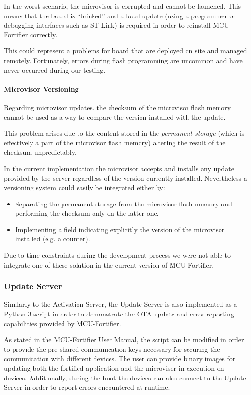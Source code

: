 \documentclass{article}
\begin{document}
In the worst scenario, the microvisor is corrupted and cannot be launched. This means that the board is ``bricked'' and a local update (using a programmer or debugging interfaces such as ST-Link) is required in order to reinstall MCU-Fortifier correctly.

This could represent a problems for board that are deployed on site and managed remotely. Fortunately, errors during flash programming are uncommon and have never occurred during our testing.

\paragraph{Microvisor Versioning}
Regarding microvisor updates, the checksum of the microvisor flash memory cannot be used as a way to compare the version installed with the update.

This problem arises due to the content stored in the \textit{permanent storage} (which is effectively a part of the microvisor flash memory) altering the result of the checksum unpredictably.

In the current implementation the microvisor accepts and installs any update provided by the server regardless of the version currently installed.
Nevertheless a versioning system could easily be integrated either by:
\begin{itemize}
	\item Separating the permanent storage from the microvisor flash memory and performing the checksum only on the latter one.
	\item Implementing a field indicating explicitly the version of the microvisor installed (e.g. a counter).
\end{itemize}
Due to time constraints during the development process we were not able to integrate one of these solution in the current version of MCU-Fortifier.

\subsubsection{Update Server}
\label{subsubsec:update_server}
Similarly to the Activation Server, the Update Server is also implemented as a Python 3 script in order to demonstrate the OTA update and error reporting capabilities provided by MCU-Fortifier.

As stated in the MCU-Fortifier User Manual\cite{user_manual}, the script can be modified in order to provide the pre-shared communication keys necessary for securing the communication with different devices. The user can provide binary images for updating both the fortified application and the microvisor in execution on devices. Additionally, during the boot the devices can also connect to the Update Server in order to report errors encountered at runtime.
\end{document}
